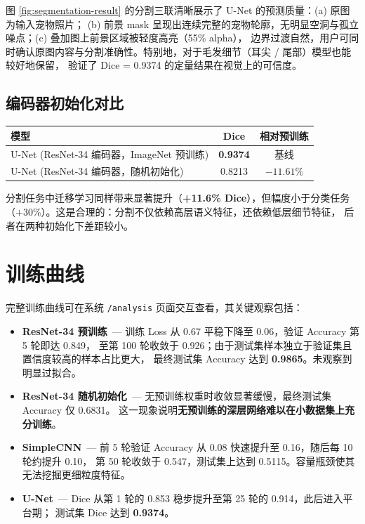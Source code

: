 \documentclass[12pt, a4paper, openany]{ctexbook}
\begin{document}
图 \ref{fig:segmentation-result} 的分割三联清晰展示了 U-Net 的预测质量：(a) 原图为输入宠物照片；
(b) 前景 mask 呈现出连续完整的宠物轮廓，无明显空洞与孤立噪点；(c) 叠加图上前景区域被轻度高亮（55\% alpha），
边界过渡自然，用户可同时确认原图内容与分割准确性。特别地，对于毛发细节（耳尖 / 尾部）模型也能较好地保留，
验证了 Dice = 0.9374 的定量结果在视觉上的可信度。

\subsection{编码器初始化对比}

\begin{center}
\begin{tabular}{L{5.5cm}cc}
  \toprule
  \textbf{模型} & \textbf{Dice} & \textbf{相对预训练} \\
  \midrule
  U-Net (ResNet-34 编码器，ImageNet 预训练) & \textbf{0.9374} & 基线 \\
  U-Net (ResNet-34 编码器，随机初始化)      & 0.8213          & $-11.61\%$ \\
  \bottomrule
\end{tabular}
\end{center}

分割任务中迁移学习同样带来显著提升（\textbf{+11.6\% Dice}），但幅度小于分类任务
（$+30\%$）。这是合理的：分割不仅依赖高层语义特征，还依赖低层细节特征，
后者在两种初始化下差距较小。

\section{训练曲线}

完整训练曲线可在系统 \texttt{/analysis} 页面交互查看，其关键观察包括：

\begin{itemize}[leftmargin=*]
  \item \textbf{ResNet-34 预训练}\ —
        训练 Loss 从 0.67 平稳下降至 0.06，验证 Accuracy 第 5 轮即达 0.849，
        至第 100 轮收敛于 0.926；由于测试集样本独立于验证集且置信度较高的样本占比更大，
        最终测试集 Accuracy 达到 \textbf{0.9865}。未观察到明显过拟合。
  \item \textbf{ResNet-34 随机初始化}\ —
        无预训练权重时收敛显著缓慢，最终测试集 Accuracy 仅 0.6831。
        这一现象说明\textbf{无预训练的深层网络难以在小数据集上充分训练}。
  \item \textbf{SimpleCNN}\ —
        前 5 轮验证 Accuracy 从 0.08 快速提升至 0.16，随后每 10 轮约提升 0.10，
        第 50 轮收敛于 0.547，测试集上达到 0.5115。容量瓶颈使其无法挖掘更细粒度特征。
  \item \textbf{U-Net}\ —
        Dice 从第 1 轮的 0.853 稳步提升至第 25 轮的 0.914，此后进入平台期；
        测试集 Dice 达到 \textbf{0.9374}。
\end{itemize}
\end{document}
